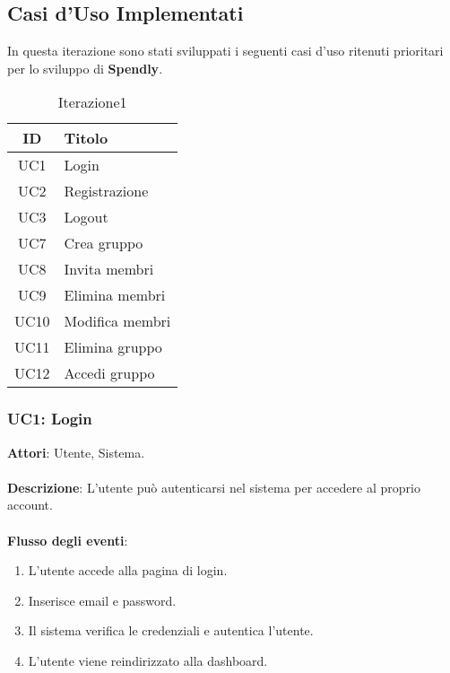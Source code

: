 \subsection{Casi d'Uso Implementati }

In questa iterazione sono stati sviluppati i seguenti casi d’uso ritenuti prioritari per lo sviluppo di \textbf{Spendly}.

\begin{table}[H]
    \centering
    \begin{tabular}{|c|l|}
    \hline
    \textbf{ID} & \textbf{Titolo} \\ \hline
    UC1 & Login\\ \hline
    UC2 & Registrazione \\ \hline
    UC3 & Logout \\ \hline
    UC7 & Crea gruppo \\ \hline
    UC8 & Invita membri \\ \hline
    UC9 & Elimina membri \\ \hline
    UC10 & Modifica membri \\ \hline
    UC11 & Elimina gruppo \\ \hline
    UC12 & Accedi gruppo \\ \hline
    \end{tabular}
    \caption{Iterazione1}
\end{table}

\subsubsection{UC1: Login}
\textbf{Attori}: Utente, Sistema.
\\
\\
\textbf{Descrizione}: L'utente può autenticarsi nel sistema per accedere al proprio account.
\\
\\
\textbf{Flusso degli eventi}:
\begin{enumerate}
    \item L'utente accede alla pagina di login.
    \item Inserisce email e password.
    \item Il sistema verifica le credenziali e autentica l'utente.
    \item L'utente viene reindirizzato alla dashboard.
\end{enumerate}

